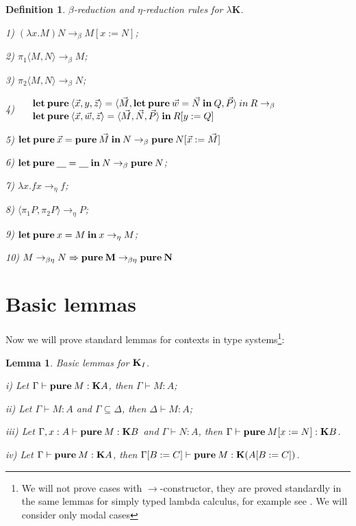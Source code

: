 \documentclass[a4paper]{article}
\newtheorem{lemma}{Lemma}
\newtheorem{defin}{Definition}
\begin{document}
  \begin{defin} $\beta$-reduction and $\eta$-reduction rules for \emph{$\lambda \textbf{K}$}.

  1) $(\lambda x. M) N \rightarrow_{\beta} M [x := N]$;

  2) $\pi_1 \langle M, N \rangle \rightarrow_{\beta} M$;

  3) $\pi_2 \langle M, N \rangle \rightarrow_{\beta} N$;

  4) $\begin{array}{llll}
  & {\bf let \: pure \:} \langle \vec{x}, y, \vec{z} \rangle = \langle \vec{M}, {\bf let \: pure \: } \vec{w} = \vec{N} {\bf \: in \: } Q, \vec{P} \rangle {\: in \:} R \rightarrow_{\beta} & \\
  & {\bf let \: pure \:} \langle \vec{x}, \vec{w}, \vec{z} \rangle = \langle \vec{M}, \vec{N}, \vec{P} \rangle \: { \bf in } \: R [y := Q]
  \end{array}$

  5) ${\bf let \: pure \:} \vec{x} = {\bf pure \:} \vec{M} {\: \bf in \:} N \rightarrow_{\beta} {\bf pure \:} N [\vec{x} := \vec{M}]$

  6) ${\bf let \: pure \:} \underline{\quad} = \underline{\quad} {\: \bf in \:} N \rightarrow_{\beta} {\bf pure \:} N$;

  7) $\lambda x. f x \rightarrow_{\eta} f$;

  8) $\langle \pi_1 P, \pi_2 P \rangle \rightarrow_{\eta} P$;

  9) ${\bf let \: pure \:} x = M {\: \bf in \: } x \rightarrow_{\eta} M$;

  10) $M \rightarrow_{\beta \eta} N \Rightarrow {\bf pure \: M} \rightarrow_{\beta \eta} {\bf pure \: N}$
  \end{defin}


  \section{Basic lemmas}

  Now we will prove standard lemmas for contexts in type systems\footnote{We will not prove cases with
  $\to$-constructor, they are proved standardly in the same lemmas for simply typed lambda calculus, for
  example see \cite{Neder} \cite{Morten} \cite{Girard}. We will consider only modal cases}:

\begin{lemma} Basic lemmas for ${\bf K}_I$.

  i) Let $\Gamma \vdash {\bf pure \:} M : {\bf K}A$, then $\Gamma \vdash M : A$;

  ii) Let $\Gamma \vdash M : A$ and $\Gamma \subseteq \Delta$, then $\Delta \vdash M : A$;

  iii) Let $\Gamma, x : A \vdash {\bf pure \:} M : {\bf K}B$ and $\Gamma \vdash N : A$, then $\Gamma \vdash {\bf pure \:} M [x := N] : {\bf K}B$.

  iv) Let $\Gamma \vdash {\bf pure \:} M : {\bf K}A$, then $\Gamma [B := C] \vdash {\bf pure \:} M : {\bf K} (A [B := C])$.
\end{lemma}
\end{document}

